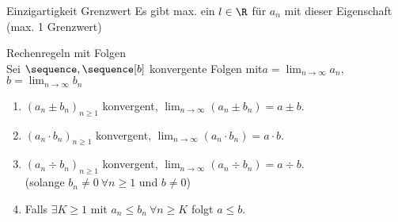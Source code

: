 \begin{lemma}{Einzigartigkeit Grenzwert}
     Es gibt max. ein $l \in \R$ für $a_n$ mit dieser Eigenschaft (max. 1 Grenzwert)
\end{lemma}

\begin{theorem}{Rechenregeln mit Folgen}
    \\Sei $\sequence,\sequence[b]$ konvergente Folgen mit$a = \lim_{n \to \infty} a_n$, $b = \lim_{n \to \infty} b_n$
    \begin{enumerate}
        \item $(a_n \pm b_n)_{n \geq 1}$ konvergent, $\lim_{n \to \infty} (a_n \pm b_n) = a \pm b$.
        \item $(a_n \cdot b_n)_{n \geq 1}$ konvergent, $\lim_{n \to \infty} (a_n \cdot b_n) = a \cdot b$.
        \item $(a_n \div  b_n)_{n \geq 1}$ konvergent, $\lim_{n \to \infty} (a_n \div b_n) = a \div b$.
        \\(solange $b_n \neq 0 ~ \forall n \geq 1$ und $b \neq 0$)
        \item Falls $\exists K \geq 1$ mit $a_n \leq b_n ~ \forall n \geq K$ folgt $a \leq b$.
    \end{enumerate}
\end{theorem}

